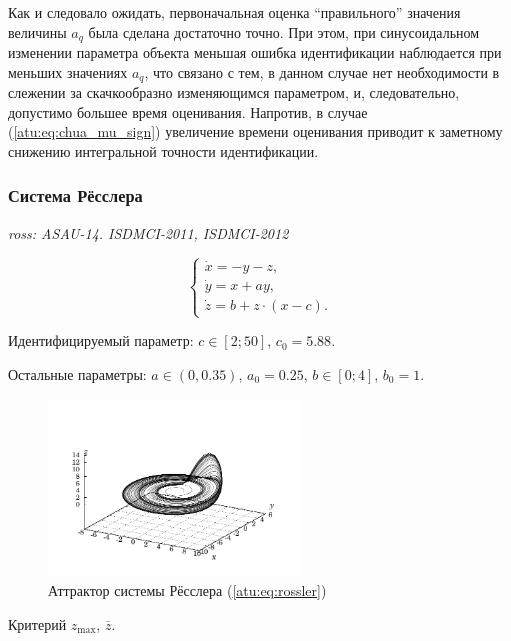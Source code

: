 \documentclass[a4paper,12pt]{article}
\newcommand{\LinkRef}[1]{ \textit{#1} }
\begin{document}
Как и следовало ожидать, первоначальная оценка ``правильного'' значения величины $a_q$
была сделана достаточно точно. При этом, при синусоидальном изменении параметра объекта
меньшая ошибка идентификации наблюдается при меньших значениях $a_q$, что связано
с тем, в данном случае нет необходимости в слежении за скачкообразно изменяющимся параметром,
и, следовательно, допустимо большее время оценивания. Напротив, в случае (\ref{atu:eq:chua_mu_sign})
увеличение времени оценивания приводит к заметному снижению интегральной точности идентификации.



\FloatBarrier
\subsubsection{Система Рёсслера} %

\LinkRef{
  ross: ASAU-14. ISDMCI-2011, ISDMCI-2012
}

\begin{equation}
\begin{cases}
  \dot{x}  = -y - z  ,  \\
  \dot{y}  = x + a y ,\\
  \dot{z}  = b + z \cdot ( x-c ) .
\end{cases}
\label{atu:eq:rossler}
\end{equation}

Идентифицируемый параметр:
$ c \in [2; 50] $, $c_0=5.88$.

Остальные параметры:
\( a \in (0, 0.35 ) \), $a_0=0.25$,
\(b \in[0;4] \), $b_0=1$.

\begin{figure}[htb!]
\centerline{\includegraphics[width=0.6\textwidth]{p/cha/ross_phase3.pdf} }
\caption{Аттрактор системы Рёсслера (\ref{atu:eq:rossler})}
\label{atu:f:ross_phase}
\end{figure}

Критерий
$ z_{\max}$, $ \overline{z} $.
\end{document}
